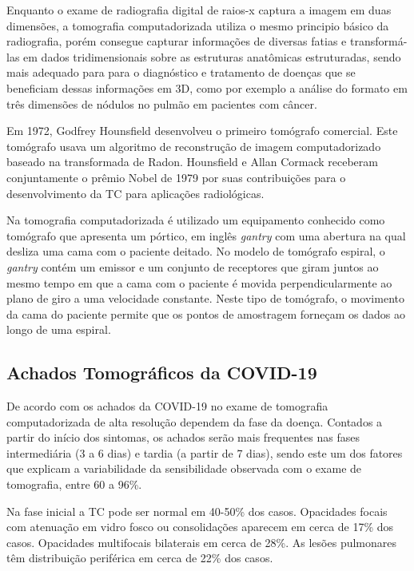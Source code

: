 Enquanto o exame de radiografia digital de raios-x captura a imagem em duas dimensões, a tomografia computadorizada utiliza o mesmo principio básico da radiografia, porém consegue capturar informações de diversas fatias e transformá-las em dados tridimensionais sobre as estruturas anatômicas estruturadas, sendo mais adequado para para o diagnóstico e tratamento de doenças que se beneficiam dessas informações em 3D, como por exemplo a análise do formato em três dimensões de nódulos no pulmão em pacientes com câncer.

Em 1972, Godfrey Hounsfield desenvolveu o primeiro tomógrafo comercial. Este tomógrafo usava um algoritmo de reconstrução de imagem computadorizado baseado na transformada de Radon. Hounsfield e Allan Cormack receberam conjuntamente o prêmio Nobel de 1979 por suas contribuições para o desenvolvimento da TC para aplicações radiológicas.

Na tomografia computadorizada é utilizado um equipamento conhecido como tomógrafo que apresenta um pórtico, em inglês \textit{gantry} com uma abertura na qual desliza uma cama com o paciente deitado. No modelo de tomógrafo espiral, o \textit{gantry} contém um emissor e um conjunto de receptores que giram juntos ao mesmo tempo em que a cama com o paciente é movida perpendicularmente ao plano de giro a uma velocidade constante. Neste tipo de tomógrafo, o movimento da cama do paciente permite que os pontos de amostragem forneçam os dados ao longo de uma espiral.

\subsection{Achados Tomográficos da COVID-19 }\label{subsec:cap_fundamentos_achados_tomograficos}

De acordo com \cite{dias2020orientaccoes} os achados da COVID-19 no exame de tomografia computadorizada de alta resolução dependem da fase da doença. Contados a partir do início dos sintomas, os achados serão mais frequentes nas fases intermediária (3 a 6 dias) e tardia (a partir de 7 dias), sendo este um dos fatores que explicam a variabilidade da sensibilidade observada com o exame de tomografia, entre 60 a 96\%.

Na fase inicial a TC pode ser normal em 40-50\% dos casos. Opacidades focais com atenuação em vidro fosco ou consolidações aparecem em cerca de 17\% dos casos.  Opacidades multifocais bilaterais em cerca de 28\%. As lesões pulmonares têm distribuição periférica em cerca de 22\% dos casos.

